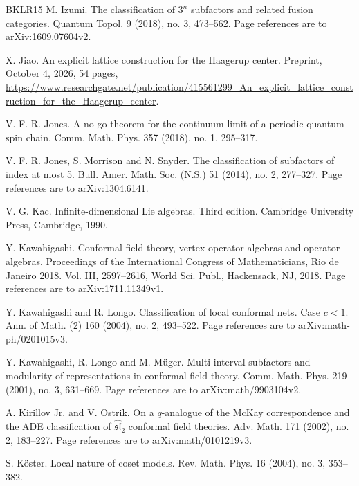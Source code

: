 \documentclass[leqno]{article}
\numberwithin{equation}{section}
\begin{document}
\begin{thebibliography}{BKLR15}
M. Izumi.
\newblock The classification of $3^n$ subfactors and related fusion categories.
\newblock Quantum Topol. 9 (2018), no. 3, 473--562. Page references are to arXiv:1609.07604v2.

X. Jiao.
\newblock An explicit lattice construction for the Haagerup center.
\newblock Preprint, October 4, 2026, 54 pages, \url{https://www.researchgate.net/publication/415561299_An_explicit_lattice_construction_for_the_Haagerup_center}.

V. F. R. Jones.
\newblock A no-go theorem for the continuum limit of a periodic quantum spin chain.
\newblock Comm. Math. Phys. 357 (2018), no. 1, 295--317.

V. F. R. Jones, S. Morrison and N. Snyder.
\newblock The classification of subfactors of index at most 5.
\newblock Bull. Amer. Math. Soc. (N.S.) 51 (2014), no. 2, 277--327. Page references are to arXiv:1304.6141.

V. G. Kac.
\newblock Infinite-dimensional Lie algebras. Third edition.
\newblock Cambridge University Press, Cambridge, 1990.

Y. Kawahigashi.
\newblock Conformal field theory, vertex operator algebras and operator algebras.
\newblock Proceedings of the International Congress of Mathematicians, Rio de Janeiro 2018. Vol. III, 2597--2616, World Sci. Publ., Hackensack, NJ, 2018. Page references are to arXiv:1711.11349v1.

Y. Kawahigashi and R. Longo.
\newblock Classification of local conformal nets. Case $c < 1$.
\newblock Ann. of Math. (2) 160 (2004), no. 2, 493--522. Page references are to arXiv:math-ph/0201015v3.

Y. Kawahigashi, R. Longo and M. Müger.
\newblock Multi-interval subfactors and modularity of representations in conformal field theory.
\newblock Comm. Math. Phys. 219 (2001), no. 3, 631--669. Page references are to arXiv:math/9903104v2.

A. Kirillov Jr. and V. Ostrik.
\newblock On a $q$-analogue of the McKay correspondence and the ADE classification of $\widehat{\mathfrak{sl}}_2$ conformal field theories.
\newblock Adv. Math. 171 (2002), no. 2, 183--227. Page references are to arXiv:math/0101219v3.

S. K\"oster.
\newblock Local nature of coset models.
\newblock Rev. Math. Phys. 16 (2004), no. 3, 353--382.


\end{thebibliography}
\end{document}
